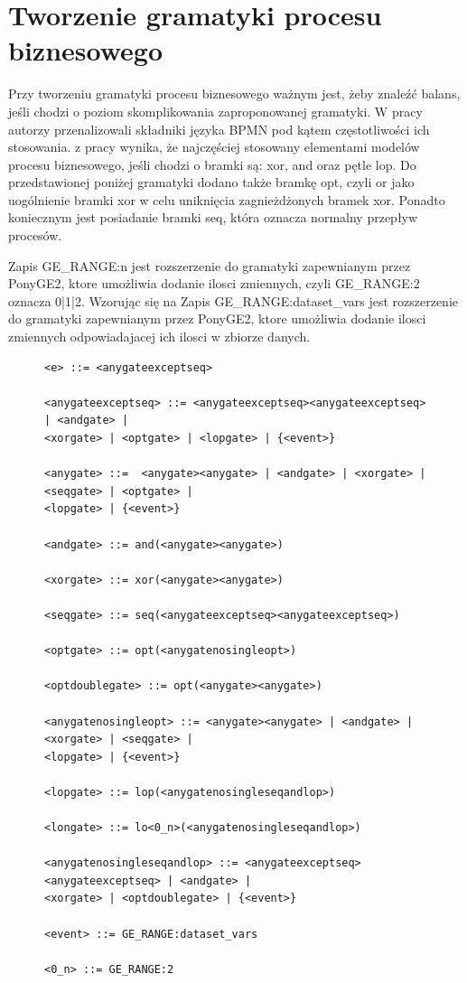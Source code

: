 \section{Tworzenie gramatyki procesu biznesowego}

Przy tworzeniu gramatyki procesu biznesowego ważnym jest, żeby znaleźć balans, jeśli chodzi o poziom skomplikowania zaproponowanej
gramatyki.  W pracy \cite{10.1007/978-3-540-69534-9_35} autorzy przenalizowali składniki języka BPMN pod kątem częstotliwości ich stosowania. z pracy wynika, że najczęściej stosowany elementami modelów procesu biznesowego, jeśli chodzi o bramki są: xor, and oraz pętle lop. Do przedstawionej poniżej gramatyki dodano także bramkę opt, czyli or jako uogólnienie bramki xor w celu uniknięcia zagnieżdżonych bramek xor. Ponadto koniecznym jest posiadanie bramki seq, która oznacza normalny przepływ procesów.

Zapis GE{\_}RANGE:n jest rozszerzenie do gramatyki zapewnianym przez PonyGE2, ktore umożliwia dodanie ilosci zmiennych, czyli GE_RANGE:2 oznacza 0|1|2.
Wzorując się na  Zapis GE{\_}RANGE:dataset{\_}vars jest rozszerzenie do gramatyki zapewnianym przez PonyGE2, ktore umożliwia dodanie ilosci zmiennych odpowiadajacej ich ilosci w zbiorze danych.
\begin{figure}[!ht]
\lstset{caption=Gramatyka procesu biznesowego, captionpos=b}
\lstset{label=src:grammar, frame=single}
\begin{lstlisting}
<e> ::= <anygateexceptseq>

<anygateexceptseq> ::= <anygateexceptseq><anygateexceptseq> | <andgate> | 
<xorgate> | <optgate> | <lopgate> | {<event>}

<anygate> ::=  <anygate><anygate> | <andgate> | <xorgate> | <seqgate> | <optgate> | 
<lopgate> | {<event>}

<andgate> ::= and(<anygate><anygate>)

<xorgate> ::= xor(<anygate><anygate>)

<seqgate> ::= seq(<anygateexceptseq><anygateexceptseq>)

<optgate> ::= opt(<anygatenosingleopt>)

<optdoublegate> ::= opt(<anygate><anygate>)

<anygatenosingleopt> ::= <anygate><anygate> | <andgate> | <xorgate> | <seqgate> | 
<lopgate> | {<event>}

<lopgate> ::= lop(<anygatenosingleseqandlop>)

<longate> ::= lo<0_n>(<anygatenosingleseqandlop>)

<anygatenosingleseqandlop> ::= <anygateexceptseq><anygateexceptseq> | <andgate> | 
<xorgate> | <optdoublegate> | {<event>}

<event> ::= GE_RANGE:dataset_vars

<0_n> ::= GE_RANGE:2
\end{lstlisting}
\end{figure}

